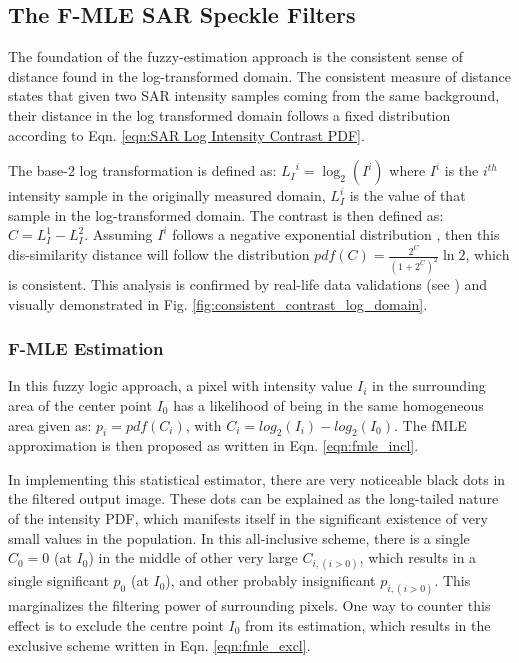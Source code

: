 \subsection{The F-MLE SAR Speckle Filters}
  
The foundation of the fuzzy-estimation approach is the consistent sense of distance found in the log-transformed domain.
The consistent measure of distance states that given two SAR intensity samples coming from the same background, their distance in the log transformed domain follows a fixed distribution according to Eqn. \ref{eqn:SAR Log Intensity Contrast PDF}.

The base-2 log transformation is defined as:
${L_I}^i = \log_2{(I^i)}$ 
where 
	$I^i$ is the \textit{$i^{th}$} intensity sample in the originally measured domain,
	$L_I^i$ is the value of that sample in the log-transformed domain.
The contrast is then defined as:
$C= L_I^1 - L_I^2$. 
Assuming $I^i$ follows a negative exponential distribution \citep{Goodman_JOptSocAm_76}, 
  then this dis-similarity distance will follow the distribution 
$pdf(C)= \frac{2^C}{(1+2^C)^2} \ln2$,
  which is consistent.
This analysis is confirmed by real-life data validations (see \cite{Le_2010_ACRS}) and visually demonstrated in Fig. \ref{fig:consistent_contrast_log_domain}.

\subsubsection{F-MLE Estimation}

In this fuzzy logic approach, a pixel with intensity value $I_i$ in the surrounding area of the center point $I_0$ has a likelihood of being in the same homogeneous area given as: 
$p_i = pdf(C_i)$, with $C_i=log_2(I_i) - log_2(I_0)$.
The fMLE approximation is then proposed as written in Eqn. \ref{eqn:fmle_incl}. 

In implementing this statistical estimator, there are very noticeable black dots in the filtered output image.
These dots can be explained as the long-tailed nature of the intensity PDF, 
  which manifests itself in the significant existence of very small values in the population.
In this all-inclusive scheme, there is 
	a single $C_0=0$ (at $I_0$) in the middle of other very large $C_{i, (i > 0)}$, which results in
	a single significant $p_0$ (at $I_0$), and other probably insignificant $p_{i, (i>0)}$.
This marginalizes the filtering power of surrounding pixels.
One way to counter this effect is to exclude the centre point $I_0$ from its estimation,
  which results in the exclusive scheme written in Eqn. \ref{eqn:fmle_excl}.

